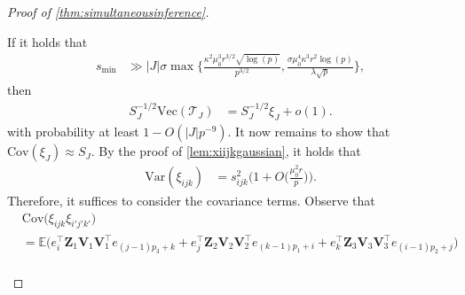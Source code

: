 \documentclass[10pt]{article}
\newcommand{\0}{{\mathbf{0}}}
\newcommand{\1}{{\mathbf{1}}}
\renewcommand{\t}{^{\top}}
\begin{document}
\begin{proof}[Proof of \cref{thm:simultaneousinference}]
\begin{itemize}
If it holds that
\begin{align}
    s_{\min} &\gg |J| \sigma\max\bigg\{ \frac{ \kappa^2 \mu_0^3 r^{3/2} \sqrt{\log(p)}}{p^{3/2}}, \frac{\sigma \mu_0^4 \kappa^3 r^2 \log(p)}{\lambda \sqrt{p}}\bigg\}, \label{smin0}
\end{align}
then 
\begin{align*}
    S_J^{-1/2} \mathrm{Vec}(\mathcal{T}_J) &= S_{J}^{-1/2} \xi_J + o(1).
\end{align*}
with probability at least $1 - O(|J|p^{-9})$.  It now remains to show that $\mathrm{Cov}(\xi_J) \approx S_J$.  By the proof of \cref{lem:xiijkgaussian}, it holds that
\begin{align*}
    \mathrm{Var}(\xi_{ijk}) &= s^2_{ijk} \bigg( 1 + O\big( \frac{\mu_0^2 r}{p} \big) \bigg).
\end{align*}
Therefore, it suffices to consider the covariance terms.  Observe that
\begin{align*}
    &\mathrm{Cov}\bigg( \xi_{ijk} \xi_{i'j'k'}\bigg) \\&= \mathbb{E}\bigg( {e}_{i}^{\top} \mathbf{Z}_{1} \mathbf{V}_{1} \mathbf{V}_{1}^{\top} e_{(j-1) p_{3}+k}+e_{j}^{\top} \mathbf{Z}_{2} \mathbf{V}_{2} \mathbf{V}_{2}^{\top} e_{(k-1) p_{1}+i}+e_{k}^{\top} \mathbf{Z}_{3} \mathbf{V}_{3} \mathbf{V}_{3}^{\top} e_{(i-1) p_{2}+j} \bigg)\\

\end{align*}
\end{itemize}
\end{proof}
\end{document}
